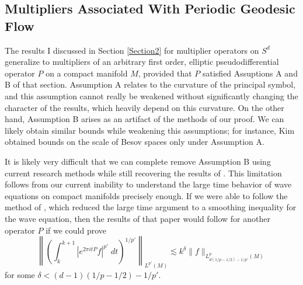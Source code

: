 \documentclass[11pt]{article}
\begin{document}



\subsection{Multipliers Associated With Periodic Geodesic Flow}

The results I discussed in Section \ref{Section2} for multiplier operators on $S^d$ generalize to multipliers of an arbitrary first order, elliptic pseudodifferential operator $P$ on a compact manifold $M$, provided that $P$ satisfied Assuptions A and B of that section. Assumption A relates to the curvature of the principal symbol, and this assumption cannot really be weakened without significantly changing the character of the results, which heavily depend on this curvature. On the other hand, Assumption B arises as an artifact of the methods of our proof. We can likely obtain similar bounds while weakening this assumptions; for instance, Kim \cite{KimManifold} obtained bounds on the scale of Besov spaces only under Assumption A.

It is likely very difficult that we can complete remove Assumption B using current research methods while still recovering the results of \cite{DensonCharacterization}. This limitation follows from our current inability to understand the large time behavior of wave equations on compact manifolds precisely enough. If we were able to follow the method of \cite{DensonCharacterization}, which reduced the large time argument to a smoothing inequality for the wave equation, then the results of that paper would follow for another operator $P$ if we could prove
%
\begin{equation} \label{smoothingbound}
	\left\| \left( \int_k^{k+1} |e^{2 \pi i t P} f|^{p'}\; dt \right)^{1/p'} \right\|_{L^{p'}(M)} \lesssim k^\delta \| f \|_{L^p_{d(1/p - 1/2) - 1/p'}(M)}
\end{equation}
%
for some $\delta < (d-1)(1/p - 1/2) - 1/p'$.
\end{document}
